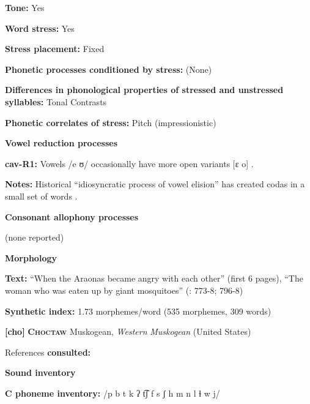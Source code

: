 \textbf{Tone:} Yes



\textbf{Word stress:} Yes



\textbf{Stress placement:} Fixed



\textbf{Phonetic processes conditioned by stress:} (None)



\textbf{Differences in phonological properties of stressed and unstressed syllables:} Tonal Contrasts



\textbf{Phonetic correlates of stress:} Pitch (impressionistic)



\textbf{Vowel reduction processes}



\textbf{cav-R1:} Vowels /e ʊ/ occasionally have more open variants [ɛ o] \citep[29]{Guillaume2008}.



\textbf{Notes:} Historical “idiosyncratic process of vowel elision” has created codas in a small set of words \citep[29]{Guillaume2008}.



\textbf{Consonant allophony processes}



(none reported)



\textbf{Morphology}



\textbf{Text:} “When the Araonas became angry with each other” (first 6 pages), “The woman who was eaten up by giant mosquitoes” (\citealt{Guillaume2008}: 773-8; 796-8)



\textbf{Synthetic index:} 1.73 morphemes/word (535 morphemes, 309 words)



\textbf{[cho]}   \textbf{\textsc{Choctaw}}  Muskogean, \textit{Western} \textit{Muskogean} (United States)



References \textbf{consulted:} \citet{Broadwell2006}



\textbf{Sound inventory}



\textbf{C phoneme inventory:} /p b t k ʔ t͡ʃ f s ʃ h m n l ɬ w j/



